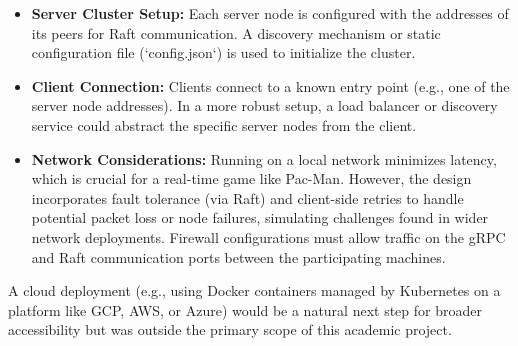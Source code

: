 \documentclass[11pt]{article}
\begin{document}
\begin{itemize}
    \item \textbf{Server Cluster Setup:} Each server node is configured with the addresses of its peers for Raft communication. A discovery mechanism or static configuration file (`config.json`) is used to initialize the cluster.
    \item \textbf{Client Connection:} Clients connect to a known entry point (e.g., one of the server node addresses). In a more robust setup, a load balancer or discovery service could abstract the specific server nodes from the client.
    \item \textbf{Network Considerations:} Running on a local network minimizes latency, which is crucial for a real-time game like Pac-Man. However, the design incorporates fault tolerance (via Raft) and client-side retries to handle potential packet loss or node failures, simulating challenges found in wider network deployments. Firewall configurations must allow traffic on the gRPC and Raft communication ports between the participating machines.
\end{itemize}
A cloud deployment (e.g., using Docker containers managed by Kubernetes on a platform like GCP, AWS, or Azure) would be a natural next step for broader accessibility but was outside the primary scope of this academic project.
\end{document}
